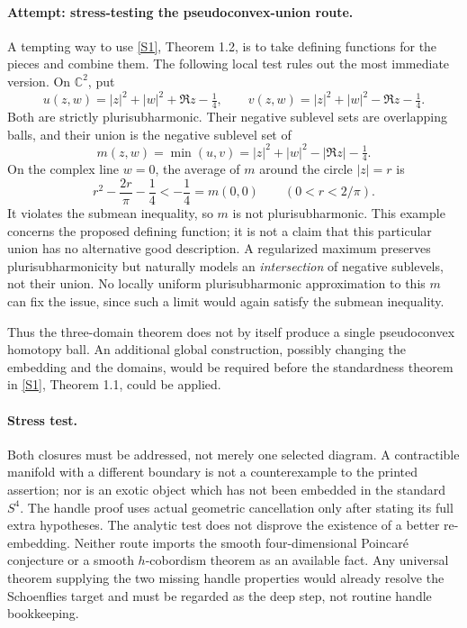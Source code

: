 \documentclass[11pt,a4paper]{article}
\newcommand{\C}{\mathbb{C}}
\newcommand{\sref}[2]{\hyperlink{source:#1:#2}{[S#2]}}
\numberwithin{equation}{section}
\begin{document}
\paragraph{Attempt: stress-testing the pseudoconvex-union route.}
A tempting way to use \sref{3410}{1}, Theorem 1.2, is to take defining
functions for the pieces and combine them. The following local test
rules out the most immediate version. On $\C^2$, put
\begin{equation}
 u(z,w)=|z|^2+|w|^2+\Re z-\tfrac14,\qquad
 v(z,w)=|z|^2+|w|^2-\Re z-\tfrac14.
\end{equation}
Both are strictly plurisubharmonic. Their negative sublevel sets are
overlapping balls, and their union is the negative sublevel set of
\begin{equation}
 m(z,w)=\min(u,v)=|z|^2+|w|^2-|\Re z|-\tfrac14.
\end{equation}
On the complex line $w=0$, the average of $m$ around the circle
$|z|=r$ is
\begin{equation}
 r^2-\frac{2r}{\pi}-\frac14<-\frac14=m(0,0)
 \qquad(0<r<2/\pi).
\end{equation}
It violates the submean inequality, so $m$ is not plurisubharmonic.
This example concerns the proposed defining function; it is not a
claim that this particular union has no alternative good description.
A regularized maximum preserves plurisubharmonicity but naturally
models an \emph{intersection} of negative sublevels, not their union.
No locally uniform plurisubharmonic approximation to this $m$ can fix
the issue, since such a limit would again satisfy the submean inequality.

Thus the three-domain theorem does not by itself produce a single
pseudoconvex homotopy ball. An additional global construction, possibly
changing the embedding and the domains, would be required before the
standardness theorem in \sref{3410}{1}, Theorem 1.1, could be applied.

\paragraph{Stress test.}
Both closures must be addressed, not merely one selected diagram. A
contractible manifold with a different boundary is not a counterexample
to the printed assertion; nor is an exotic object which has not been
embedded in the standard $S^4$. The handle proof uses actual geometric
cancellation only after stating its full extra hypotheses. The analytic
test does not disprove the existence of a better re-embedding. Neither
route imports the smooth four-dimensional Poincar\'e conjecture or a
smooth $h$-cobordism theorem as an available fact. Any universal theorem
supplying the two missing handle properties would already resolve the
Schoenflies target and must be regarded as the deep step, not routine
handle bookkeeping.
\end{document}
